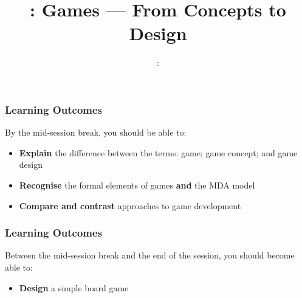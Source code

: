 \usepackage{../../beamerthemeFalmouthGamesAcademy}
\usepackage{multimedia}
\graphicspath{ {../../} }


\usepackage[normalem]{ulem}
\usepackage{wasysym}

\usepackage{pdfpages}

\usetikzlibrary{arrows,automata}







\title{\sessionnumber: Games --- From Concepts to Design}
\subtitle{\modulecode: \moduletitle}

\frame{\titlepage} 

\begin{frame}
	\frametitle{Learning Outcomes}
	
	By the mid-session break, you should be able to:
	
	\begin{itemize}
		\item \textbf{Explain} the difference between the terms: game; game concept; and game design
		\item \textbf{Recognise} the formal elements of games \textbf{and} the MDA model
		\item \textbf{Compare and contrast} approaches to game development
	\end{itemize}
\end{frame}

\begin{frame}
	\frametitle{Learning Outcomes}
	
	Between the mid-session break and the end of the session, you should become able to:
	
	\begin{itemize}
		\item \textbf{Design} a simple board game
	\end{itemize}
\end{frame}


